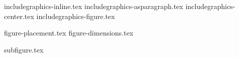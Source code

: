 \documentclass[presentatie.tex]{subfiles}
\begin{document}

\clearrecentlist


{includegraphics-inline.tex}
{includegraphics-asparagraph.tex}
{includegraphics-center.tex}
{includegraphics-figure.tex}

{figure-placement.tex}
{figure-dimensions.tex}

{subfigure.tex}
\end{document}
